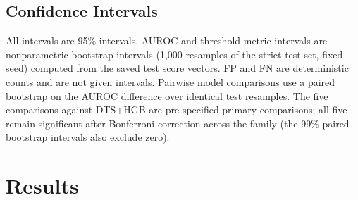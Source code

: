 \documentclass[letterpaper]{article}
\begin{document}
\begin{table}[t]
\centering
\scriptsize
\setlength{\tabcolsep}{3.5pt}
\caption{Hyperparameter grids and validation-selected configurations for the DTS classifiers and MiniROCKET. Neural baseline architectures are fixed a priori (see text); their decision thresholds are tuned on validation F1 like all other models.}
\label{tab:hyper}
\end{table}

\subsection{Confidence Intervals}
All intervals are 95\% intervals. AUROC and threshold-metric intervals are nonparametric bootstrap intervals (1{,}000 resamples of the strict test set, fixed seed) computed from the saved test score vectors. FP and FN are deterministic counts and are not given intervals. Pairwise model comparisons use a paired bootstrap on the AUROC difference over identical test resamples. The five comparisons against DTS+HGB are pre-specified primary comparisons; all five remain significant after Bonferroni correction across the family (the 99\% paired-bootstrap intervals also exclude zero).

\section{Results}
\end{document}

